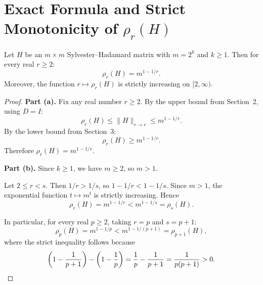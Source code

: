 \section{Exact Formula and Strict Monotonicity of $\rho_r(H)$}

\begin{theorem}\label{thm:rho-formula}
Let $H$ be an $m \times m$ Sylvester--Hadamard matrix with $m = 2^k$ and $k \geq 1$. Then for every real $r \geq 2$:
\[
\rho_r(H) = m^{1-1/r}.
\]
Moreover, the function $r \mapsto \rho_r(H)$ is strictly increasing on $[2, \infty)$.
\end{theorem}

\begin{proof}
\textbf{Part (a).} Fix any real number $r \geq 2$. By the upper bound from Section~2, using $D = I$:
\[
\rho_r(H) \leq \|H\|_{r \to r} \leq m^{1 - 1/r}.
\]
By the lower bound from Section~3:
\[
\rho_r(H) \geq m^{1 - 1/r}.
\]
Therefore $\rho_r(H) = m^{1 - 1/r}$.

\medskip

\textbf{Part (b).} Since $k \geq 1$, we have $m \geq 2$, so $m > 1$.

Let $2 \leq r < s$. Then $1/r > 1/s$, so $1 - 1/r < 1 - 1/s$. Since $m > 1$, the exponential function $t \mapsto m^t$ is strictly increasing. Hence
\[
\rho_r(H) = m^{1 - 1/r} < m^{1 - 1/s} = \rho_s(H).
\]

In particular, for every real $p \geq 2$, taking $r = p$ and $s = p+1$:
\[
\rho_p(H) = m^{1-1/p} < m^{1-1/(p+1)} = \rho_{p+1}(H),
\]
where the strict inequality follows because
\[
\left(1 - \frac{1}{p+1}\right) - \left(1 - \frac{1}{p}\right) = \frac{1}{p} - \frac{1}{p+1} = \frac{1}{p(p+1)} > 0. \qedhere
\]
\end{proof}

